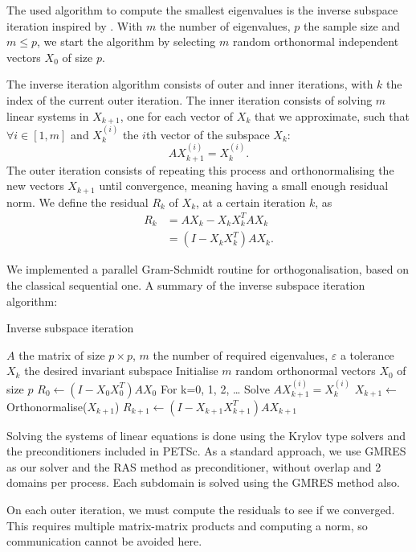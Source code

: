 The used algorithm to compute the smallest eigenvalues is the inverse subspace iteration inspired by \cite{el_khoury_acceleration_2014}.
\ifthesis
 With \(m\) the number of eigenvalues, \(p\) the sample size and \(m \le p\), we start the algorithm by selecting \(m\) random orthonormal independent vectors \(X_0\) of size \(p\).
 
 The inverse iteration algorithm consists of outer and inner iterations, with \(k\) the index of the current outer iteration.
 The inner iteration consists of solving \(m\) linear systems in \(X_{k+1}\), one for each vector of \(X_k\) that we approximate, such that \(\forall i \in [1, m]\) and \(X_k^{(i)}\) the \(i\)th vector of the subspace \(X_k\):
 \[A X_{k+1}^{(i)} = X_k^{(i)}.\]
 The outer iteration consists of repeating this process and orthonormalising the new vectors \(X_{k+1}\) until convergence, meaning having a small enough residual norm.
 We define the residual \(R_k\) of \(X_k\), at a certain iteration \(k\), as
 \begin{equation}
  \begin{split}
   R_k & = A X_k - X_k X_k^T A X_k \\
       & = (I - X_k X_k^T) A X_k.
  \end{split}
 \end{equation}

 We implemented a parallel Gram-Schmidt routine for orthogonalisation, based on the classical sequential one.
 A summary of the inverse subspace iteration algorithm:

 \begin{algorithm}[H]
  \caption{Inverse subspace iteration}
  \begin{algorithmic}
   \REQUIRE \(A\) the matrix of size \(p \times p\), \(m\) the number of required eigenvalues, \(\varepsilon\) a tolerance
   \ENSURE \(X_k\) the desired invariant subspace
   \STATE Initialise \(m\) random orthonormal vectors \(X_0\) of size \(p\)
   \STATE \(R_0 \gets (I - X_0 X_0^T) A X_0\)
   \STATE For k=0, 1, 2, \dots
     \STATE Solve \(A X_{k+1}^{(i)} = X_k^{(i)}\)
    \ENDFOR
    \STATE \(X_{k+1} \gets \) Orthonormalise(\(X_{k+1}\))
    \STATE \(R_{k+1} \gets (I - X_{k+1} X_{k+1}^T) A X_{k+1}\)
   \ENDWHILE
  \end{algorithmic}
 \end{algorithm}
\fi

Solving the systems of linear equations is done using the Krylov type solvers and the preconditioners included in PETSc.
As a standard approach, we use GMRES as our solver and the RAS method as preconditioner, without overlap and 2 domains per process.
Each subdomain is solved using the GMRES method also.

On each outer iteration, we must compute the residuals to see if we converged.
This requires multiple matrix-matrix products and computing a norm, so communication cannot be avoided here.
